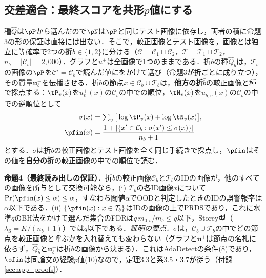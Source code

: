 \subsection{交差適合：最終スコアを共形$p$値にする}
\label{sec:xfit}
種$\hat{Q}$は$\pP$から選んだので$\pN$は$\pP$と同じテスト画像に依存し，両者の積に命題3の形の保証は直接には出ない．そこで，較正画像とテスト画像を，画像とは独立に等確率で2つの\textbf{折}$b\in\{1,2\}$に分ける（$\mathcal{C}=\mathcal{C}_1\sqcup\mathcal{C}_2$，$\mathcal{T}=\mathcal{T}_1\sqcup\mathcal{T}_2$，$n_b=|\mathcal{C}_b|=2{,}000$）．グラフと$u^{+}$は全画像で1つのままである．折$b$の種$\hat{Q}_b$は，$\mathcal{T}_b$の画像の$\pP$を$\mathcal{C}'=\mathcal{C}_b$で読んだ値にをかけて選び（命題3が折ごとに成り立つ），その質量$\mathbf{u}^{-}_b$を伝播させる．折$b$の節点$x\in\mathcal{C}_b\cup\mathcal{T}_b$は，\textbf{他方の折}$\bar{b}$の較正画像と種で採点する：$\tP_v(x)$を$u^{+}_v(x)$の$\mathcal{C}_{\bar b}$の中での順位，$\tN_v(x)$を$u^{-}_{\bar b,v}(x)$の$\mathcal{C}_{\bar b}$の中での逆順位として
\begin{equation}
\begin{aligned}
\sigma(x)&=\textstyle\sum_{v}\big[\log\tP_v(x)+\log\tN_v(x)\big],\\
\pfin(x)&=\frac{1+|\{x'\in\mathcal{C}_b:\sigma(x')\le\sigma(x)\}|}{n_b+1}
\end{aligned}
\label{eq:pfin}
\end{equation}
とする．$\sigma$は折$b$の較正画像とテスト画像を全く同じ手続きで採点し，$\pfin$はその値を\textbf{自分の折}の較正画像の中での順位で読む．

\textbf{命題4（最終読み出しの保証）．}折$b$の較正画像$\mathcal{C}_b$と$\mathcal{T}_b$のIDの画像が，他のすべての画像を所与として交換可能なら，(i) $\mathcal{T}_b$の各ID画像$x$について$\Pr(\pfin(x)\le\alpha)\le\alpha$，すなわち閾値$\alpha$でOODと判定したときのIDの誤警報率は$\alpha$以下である．(ii) $\{\pfin(x):x\in\mathcal{T}_b\}$はIDの画像の上でPRDSであり，これに水準$q$のBH法をかけて選んだ集合のFDRは$q\,m_{0,b}/m_b\le q$以下，Storey型（$\lambda_{\mathrm{S}}=K/(n_b+1)$）では$q$以下である．\textit{証明の要点．}$\sigma$は，$\mathcal{C}_b\cup\mathcal{T}_b$の中でどの節点を較正画像と呼ぶかを入れ替えても変わらない（グラフと$\mathbf{u}^{+}$は節点の名札に依らず，$\hat{Q}_{\bar b}$と$\mathbf{u}^{-}_{\bar b}$は折$\bar b$の画像から決まる）．これはAdaDetectの条件(8)であり，$\pfin$は同論文の経験$p$値(10)なので，定理3.3と系3.5・3.7が従う（付録\ref{sec:app_proofs}）．

